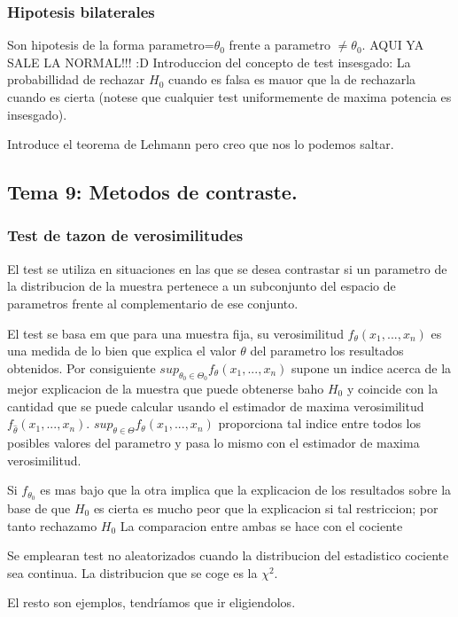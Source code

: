 \documentclass[a4paper,12pt]{article}
\begin{document}
\subsubsection{Hipotesis bilaterales}
Son hipotesis de la forma parametro=$\theta_0$ frente a parametro $\neq\theta_0$.
AQUI YA SALE LA NORMAL!!! :D
Introduccion del concepto de test insesgado: La probabillidad de rechazar $H_0$ cuando es falsa es mauor que la de rechazarla cuando es cierta (notese que cualquier  test uniformemente de maxima potencia es insesgado).


Introduce el teorema de Lehmann pero creo que nos lo podemos saltar.

\subsection{Tema 9: Metodos de contraste.}

\subsubsection{Test de tazon de verosimilitudes}
El test se utiliza en situaciones en las que se desea contrastar si un parametro de la distribucion de la muestra pertenece a un subconjunto del espacio de parametros frente al complementario de ese conjunto.

El test se basa em que para una muestra fija, su verosimilitud $f_\theta(x_1,...,x_n)$ es una medida de lo bien que explica el valor $\theta$ del parametro los resultados obtenidos. Por consiguiente $ sup_{\theta_0\in\Theta_0}f_\theta(x_1,...,x_n) $ supone un indice acerca de la mejor explicacion de la muestra que puede obtenerse baho $ H_0 $ y coincide con la cantidad que se puede calcular usando el estimador de maxima verosimilitud $ f_{\hat{\theta}}(x_1,...,x_n) $. $sup_{\theta\in\Theta}f_\theta(x_1,...,x_n) $ proporciona tal indice entre todos los posibles valores del parametro y pasa lo mismo con el estimador de maxima verosimilitud.

Si $ f_{\theta_0} $ es mas bajo que la otra implica que la explicacion de los resultados sobre la base de que $H_0$ es cierta es mucho peor que la explicacion si tal restriccion; por tanto rechazamo $H_0$
La comparacion entre ambas se hace con el cociente

Se emplearan test no aleatorizados cuando la distribucion del estadistico cociente sea continua. La distribucion que se coge es la $\chi^2$.

El resto son ejemplos, tendríamos que ir eligiendolos.
\end{document}
